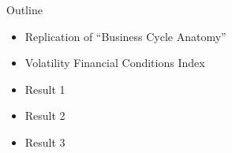 \begin{frame}{Outline}
    
    \label{outline-slide-1}

    \begin{itemize}
        
        \item Replication of ``Business Cycle Anatomy''
        
        \item Volatility Financial Conditions Index
        
        \item Result 1
        
        \item Result 2
        
        \item Result 3

    \end{itemize}

\end{frame}
